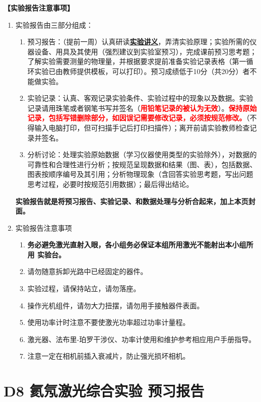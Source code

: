 \documentclass[dvipsnames, svgnames,a4paper,11pt]{article}
\begin{document}
\textbf{【实验报告注意事项】}
\begin{enumerate}
	\item 实验报告由三部分组成：
	\begin{enumerate}
		\item 预习报告：（提前一周）认真研读\underline{\textbf{实验讲义}}，弄清实验原理；实验所需的仪器设备、用具及其使用（强烈建议到实验室预习），完成课前预习思考题；了解实验需要测量的物理量，并根据要求提前准备实验记录表格（第一循环实验已由教师提供模板，可以打印）。预习成绩低于10分（共20分）者不能做实验。
	    \item 实验记录：认真、客观记录实验条件、实验过程中的现象以及数据。实验记录请用珠笔或者钢笔书写并签名（\textcolor{red}{\textbf{用铅笔记录的被认为无效}}）。\textcolor{red}{\textbf{保持原始记录，包括写错删除部分，如因误记需要修改记录，必须按规范修改。}}（不得输入电脑打印，但可扫描手记后打印扫描件）；离开前请实验教师检查记录并签名。
	    \item 分析讨论：处理实验原始数据（学习仪器使用类型的实验除外），对数据的可靠性和合理性进行分析；按规范呈现数据和结果（图、表），包括数据、图表按顺序编号及其引用；分析物理现象（含回答实验思考题，写出问题思考过程，必要时按规范引用数据）；最后得出结论。
	\end{enumerate}
	\textbf{实验报告就是将预习报告、实验记录、和数据处理与分析合起来，加上本页封面。}
	\item 实验报告注意事项
		\begin{enumerate}[label=\roman*.]
			\item \textbf{务必避免激光直射入眼，各小组务必保证本组所用激光不能射出本小组所用
			实验台。}
			\item 请勿随意拆卸光路中已经固定的器件。
			\item 实验过程，请保持站立，请勿落座。
			\item 操作光机组件，请勿大力扭摆，请勿用手接触器件表面。
			\item 使用功率计时注意不要使激光功率超过功率计量程。
			\item 激光器、法布里-珀罗干涉仪、功率计使用和维护参考相应用户手册指导。
			\item 注意一定在相机前插入衰减片，防止强光损坏相机。
		\end{enumerate}
\end{enumerate}


\clearpage
\tableofcontents
\clearpage

\setcounter{section}{0}
\section{D8 \quad 氦氖激光综合实验 \quad\heiti 预习报告}
	
\end{document}
